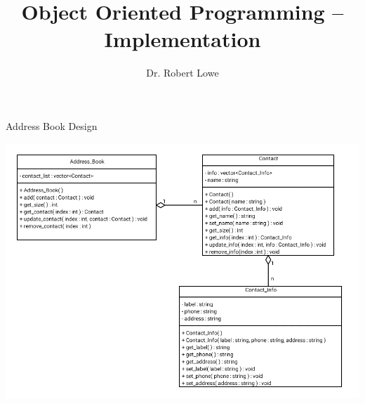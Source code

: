 \documentclass[]{beamer}
\title{Object Oriented Programming -- Implementation}
\author{Dr. Robert Lowe\\}
\institute[Maryville College] %
{
  Division of Mathematics and Computer Science\\
  Maryville College
}
\date[]{}
\begin{document}
\begin{frame}
  \titlepage
\end{frame}





\begin{frame}{Address Book Design}
\begin{adjustbox}{max width=\textwidth, max totalheight=0.95\textheight}
    \includegraphics{images/AddressBook-Class.png}
\end{adjustbox}
\end{frame}
\end{document}

